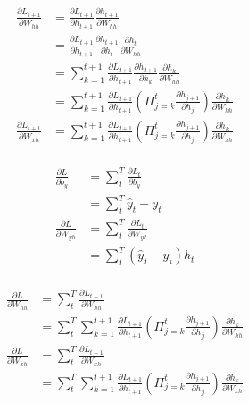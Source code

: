\documentclass{beamer}
\begin{document}
\begin{frame}
    \begin{equation*}
        \begin{aligned}
            \frac{\partial L_{t+1}}{\partial W_{hh}}
            &= \frac{\partial L_{t+1}}{\partial h_{t+1}}\frac{\partial h_{t+1}}{\partial W_{hh}} \\
            &= \frac{\partial L_{t+1}}{\partial h_{t+1}}\frac{\partial h_{t+1}}{\partial h_t}\frac{\partial h_t}{\partial W_{hh}} \\
            &= \sum_{k=1}^{t+1}\frac{\partial L_{t+1}}{\partial h_{t+1}}\frac{\partial h_{t+1}}{\partial h_k}\frac{\partial h_k}{\partial W_{hh}} \\
            &= \sum_{k=1}^{t+1}\frac{\partial L_{t+1}}{\partial h_{t+1}}\left(\Pi_{j=k}^t\frac{\partial h_{j+1}}{\partial h_j}\right)\frac{\partial h_k}{\partial W_{hh}} \\
            \frac{\partial L_{t+1}}{\partial W_{xh}}
            &= \sum_{k=1}^{t+1}\frac{\partial L_{t+1}}{\partial h_{t+1}}\left(\Pi_{j=k}^t\frac{\partial h_{j+1}}{\partial h_j}\right)\frac{\partial h_k}{\partial W_{xh}} \\
        \end{aligned}
    \end{equation*}
\end{frame}

\begin{frame}
    \begin{equation*}
        \begin{aligned}
            \frac{\partial L}{\partial b_y}
            &= \sum_t^T\frac{\partial L_t}{\partial b_y} \\
            &= \sum_t^T\hat{y}_t-y_t \\
            \frac{\partial L}{\partial W_{yh}}
            &= \sum_t^T\frac{\partial L_t}{\partial W_{yh}} \\
            &= \sum_t^T(\hat{y}_t-y_t)h_t \\
        \end{aligned}
    \end{equation*}
\end{frame}

\begin{frame}
    \begin{equation*}
        \begin{aligned}
            \frac{\partial L}{\partial W_{hh}}
            &= \sum_t^T\frac{\partial L_{t+1}}{\partial W_{hh}} \\
            &= \sum_t^T\sum_{k=1}^{t+1}\frac{\partial L_{t+1}}{\partial h_{t+1}}\left(\Pi_{j=k}^t\frac{\partial h_{j+1}}{\partial h_j}\right)\frac{\partial h_k}{\partial W_{hh}} \\
            \frac{\partial L}{\partial W_{xh}}
            &= \sum_t^T\frac{\partial L_{t+1}}{\partial W_{xh}} \\
            &= \sum_t^T\sum_{k=1}^{t+1}\frac{\partial L_{t+1}}{\partial h_{t+1}}\left(\Pi_{j=k}^t\frac{\partial h_{j+1}}{\partial h_j}\right)\frac{\partial h_k}{\partial W_{xh}} \\
        \end{aligned}
    \end{equation*}
\end{frame}
\end{document}
